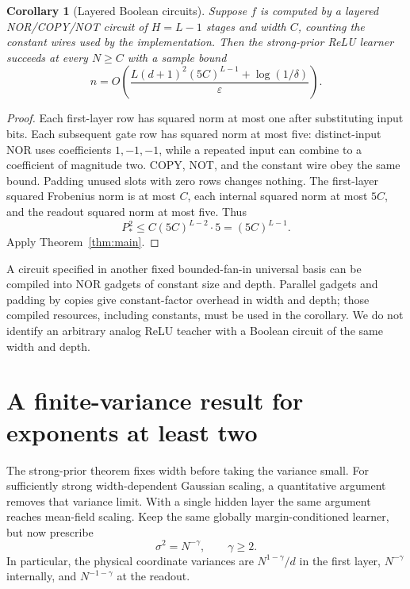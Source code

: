 \documentclass[11pt]{article}
\newtheorem{corollary}[theorem]{Corollary}
\theoremstyle{remark}\newtheorem{remark}[theorem]{Remark}
\begin{document}
\begin{corollary}[Layered Boolean circuits]
Suppose $f$ is computed by a layered NOR/COPY/NOT circuit of $H=L-1$ stages and width $C$, counting the constant wires used by the implementation. Then the strong-prior ReLU learner succeeds at every $N\ge C$ with a sample bound
\[
 n=O\!\left(\frac{L(d+1)^2(5C)^{L-1}+\log(1/\delta)}{\varepsilon}\right).
\]
\end{corollary}
\begin{proof}
Each first-layer row has squared norm at most one after substituting input bits. Each subsequent gate row has squared norm at most five: distinct-input NOR uses coefficients $1,-1,-1$, while a repeated input can combine to a coefficient of magnitude two. COPY, NOT, and the constant wire obey the same bound. Padding unused slots with zero rows changes nothing. The first-layer squared Frobenius norm is at most $C$, each internal squared norm at most $5C$, and the readout squared norm at most five. Thus
\[
 P_*^2\le C(5C)^{L-2}\cdot5=(5C)^{L-1}.
\]
Apply Theorem~\ref{thm:main}.
\end{proof}

A circuit specified in another fixed bounded-fan-in universal basis can be compiled into NOR gadgets of constant size and depth. Parallel gadgets and padding by copies give constant-factor overhead in width and depth; those compiled resources, including constants, must be used in the corollary. We do not identify an arbitrary analog ReLU teacher with a Boolean circuit of the same width and depth.

\section{A finite-variance result for exponents at least two}
The strong-prior theorem fixes width before taking the variance small. For sufficiently strong width-dependent Gaussian scaling, a quantitative argument removes that variance limit. With a single hidden layer the same argument reaches mean-field scaling. Keep the same globally margin-conditioned learner, but now prescribe
\[
 \sigma^2=N^{-\gamma},\qquad \gamma\ge2.
\]
In particular, the physical coordinate variances are $N^{1-\gamma}/d$ in the first layer, $N^{-\gamma}$ internally, and $N^{-1-\gamma}$ at the readout.
\end{document}
